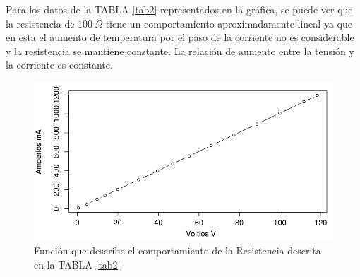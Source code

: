 \documentclass[twocolumn]{IEEEtran}
\begin{document}
\noindent
Para los datos de la TABLA \ref{tab2} representados en la gráfica, se puede ver que la resistencia de $100 \ \Omega$ tiene un comportamiento aproximadamente lineal  ya que en esta el aumento de temperatura por el paso de la corriente no es considerable y la resistencia se mantiene constante. La relación de aumento entre la tensión y la corriente es constante.
\begin{figure}[H]
	\centering
		\includegraphics[scale=0.3]{res.png}
	\caption{Función que describe el comportamiento de la Resistencia descrita en la TABLA \ref{tab2}}
	\label{fig13}
\end{figure}
\end{document}
